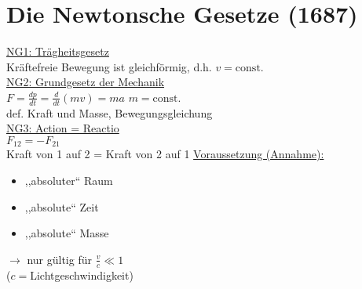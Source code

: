 \documentclass[titlepage,12pt,a4paper,ngerman]{report}
\newcommand{\tx}[1]{\textrm{#1}}
\newcommand{\const}{\tx{const.}}
\begin{document}
\section{Die Newtonsche Gesetze (1687)} %
{\large\underline{NG1: Trägheitsgesetz}}\\
Kräftefreie Bewegung ist gleichförmig, d.h. $v = \const$\\
{\large\underline{NG2: Grundgesetz der Mechanik}}\\
$ F = \frac{dp}{dt} = \frac{d}{dt}(mv) = ma$ $m = \const$\\
def. Kraft und Masse, Bewegungsgleichung\\
{\large\underline{NG3: Action = Reactio}}\\
$F_{12} = -F_{21}$\\
Kraft von 1 auf 2 = Kraft von 2 auf 1
{\large \underline{Voraussetzung (Annahme):}}
\begin{itemize}
\item ,,absoluter`` Raum
\item ,,absolute`` Zeit
\item ,,absolute`` Masse
\end{itemize}
$\rightarrow$ nur gültig für $\frac{v}{c} \ll 1$\\
($c = $Lichtgeschwindigkeit)\\
\end{document}
